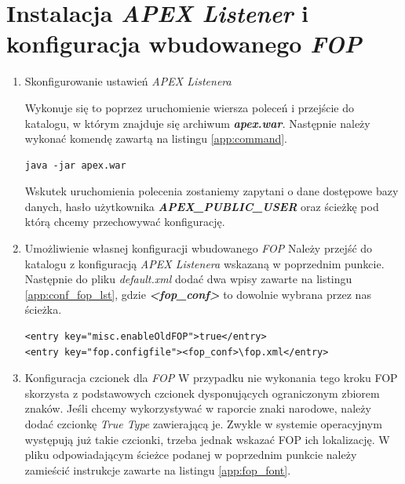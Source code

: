 \documentclass[11pt,a4paper]{article}
\begin{document}
\section{Instalacja \emph{APEX Listener} i konfiguracja wbudowanego \emph{FOP}} \label{app:conf_fop}
\begin{enumerate}
\item Skonfigurowanie ustawień \emph{APEX Listenera}

Wykonuje się to poprzez uruchomienie wiersza poleceń i przejście do katalogu, w którym znajduje się archiwum \emph{\textbf{apex.war}}. Następnie należy wykonać komendę zawartą na listingu \ref{app:command}. 

\lstset{language=XML}
\begin{lstlisting}[frame=single,caption=Komenda służąca do konfiguracji \emph{APEX Listenera},label=app:command]
java -jar apex.war
\end{lstlisting}

Wskutek uruchomienia polecenia zostaniemy zapytani o dane dostępowe bazy danych, hasło użytkownika \emph{\textbf{APEX\_PUBLIC\_USER}} oraz ścieżkę pod którą chcemy przechowywać konfigurację. 

\item{Umożliwienie własnej konfiguracji wbudowanego \emph{FOP}}
Należy przejść do katalogu z konfiguracją \emph{APEX Listenera} wskazaną w poprzednim punkcie. Następnie do pliku \emph{default.xml} dodać dwa wpisy zawarte na listingu \ref{app:conf_fop_lst}, gdzie \textbf{\emph{\textless fop\_conf\textgreater}} to dowolnie wybrana przez nas ścieżka.

\lstset{language=XML}
\begin{lstlisting}[frame=single,caption=Wpisy do zawarcia w konfiguracji \emph{APEX Listenera},label=app:conf_fop_lst]
<entry key="misc.enableOldFOP">true</entry>
<entry key="fop.configfile"><fop_conf>\fop.xml</entry>
\end{lstlisting}

\item Konfiguracja czcionek dla \emph{FOP}
W przypadku nie wykonania tego kroku FOP skorzysta z podstawowych czcionek dysponujących ograniczonym zbiorem znaków. Jeśli chcemy wykorzystywać w raporcie znaki narodowe, należy dodać czcionkę \emph{True Type} zawierającą je. Zwykle w systemie operacyjnym występują już takie czcionki, trzeba jednak wskazać FOP ich lokalizację. W pliku odpowiadającym ścieżce podanej w poprzednim punkcie należy zamieścić instrukcje zawarte na listingu \ref{app:fop_font}. 


\end{enumerate}
\end{document}
